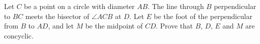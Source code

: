 Let $C$ be a point on a circle with diameter $AB$. The line through $B$ perpendicular to $BC$ meets the bisector of $\angle ACB$ at $D$. Let $E$ be the foot of the perpendicular from $B$ to $AD$, and let $M$ be the midpoint of $CD$. Prove that $B$, $D$, $E$ and $M$ are concyclic.
